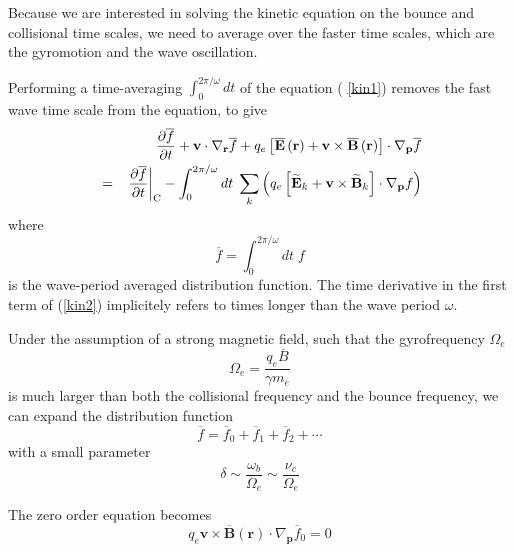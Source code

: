 Because we are interested in solving the kinetic equation on the bounce and
collisional time scales, we need to average over the faster time scales,
which are the gyromotion and the wave oscillation.

Performing a time-averaging $\int_{0}^{2\pi /\omega }dt$ of the equation (%
\ref{kin1}) removes the fast wave time scale from the equation, to give
\begin{eqnarray}
&&\frac{\partial \overline{f}}{\partial t}+\mathbf{v}\cdot \nabla _{\mathbf{r%
}}\overline{f}+q_{e}\left[ \overline{\mathbf{E}}\left( \mathbf{r}\right) +%
\mathbf{v}\times \overline{\mathbf{B}}\left( \mathbf{r}\right) \right] \cdot
\nabla _{\mathbf{p}}\overline{f}  \nonumber \\
&=&\left. \frac{\partial \overline{f}}{\partial t}\right| _{\text{C}%
}-\int_{0}^{2\pi /\omega }dt\;\sum_{k}\left( q_{e}\left[ \widetilde{\mathbf{E%
}}_{k}+\mathbf{v}\times \widetilde{\mathbf{B}}_{k}\right] \cdot \nabla _{%
\mathbf{p}}f\right)  \label{kin2}
\end{eqnarray}
where
\begin{equation}
\overline{f}=\int_{0}^{2\pi /\omega }dt\;f
\end{equation}
is the wave-period averaged distribution function. The time derivative in
the first term of (\ref{kin2}) implicitely refers to times longer than the
wave period $\omega $.

Under the assumption of a strong magnetic field, such that the gyrofrequency
$\Omega _{e}$%
\begin{equation}
\Omega _{e}=\frac{q_{e}\overline{B}}{\gamma m_{e}}
\end{equation}
is much larger than both the collisional frequency and the bounce frequency,
we can expand the distribution function
\begin{equation}
\overline{f}=\overline{f}_{0}+\overline{f}_{1}+\overline{f}_{2}+\cdots
\end{equation}
with a small parameter
\begin{equation}
\delta \sim \frac{\omega _{b}}{\Omega _{e}}\sim \frac{\nu _{c}}{\Omega _{e}}
\end{equation}

The zero order equation becomes
\begin{equation}
q_{e}\mathbf{v}\times \overline{\mathbf{B}}\left( \mathbf{r}\right) \cdot
\nabla _{\mathbf{p}}\overline{f}_{0}=0  \label{kinexp0}
\end{equation}

